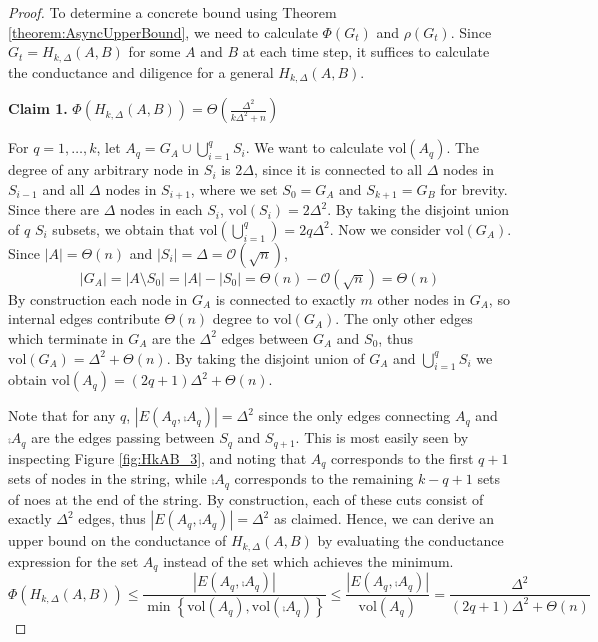 \begin{proof}
	To determine a concrete bound using Theorem \ref{theorem:AsyncUpperBound}, we need to calculate $\Phi(G_t)$ and $\rho(G_t)$. Since $G_t = H_{k, \Delta}(A, B)$ for some $A$ and $B$ at each time step, it suffices to calculate the conductance and diligence for a general $H_{k, \Delta}(A, B)$.

	\textbf{Claim 1.} $\Phi(H_{k, \Delta}(A, B)) = \Theta\left(\frac{\Delta^2}{k\Delta^2 +n }\right)$

	For $q = 1, \dots, k$, let $A_q = G_A \cup \bigcup_{i=1}^q  S_i$. We want to calculate $\text{vol}(A_q)$. The degree of any arbitrary node in $S_i$ is $2\Delta$, since it is connected to all $\Delta$ nodes in $S_{i-1}$ and all $\Delta$ nodes in $S_{i+1}$, where we set $S_0 = G_A$ and $S_{k+1} = G_B$ for brevity. Since there are $\Delta$ nodes in each $S_i$, $\text{vol}(S_i) = 2\Delta^2$. By taking the disjoint union of $q$ $S_i$ subsets, we obtain that $\text{vol}(\bigcup_{i=1}^q) = 2q\Delta^2$. Now we consider $\text{vol}(G_A)$. Since $|A| = \Theta(n)$ and $|S_i| = \Delta = \mathcal{O}(\sqrt{n})$, 
	$$
		|G_A| = |A \setminus S_0| = |A| - |S_0| = \Theta(n) - \mathcal{O}(\sqrt{n}) = \Theta(n)
	$$
	By construction each node in $G_A$ is connected to exactly $m$ %
	other nodes in $G_A$, so internal edges contribute $\Theta(n)$ degree to $\text{vol}(G_A)$. The only other edges which terminate in $G_A$ are the $\Delta^2$ edges between $G_A$ and $S_0$, thus $\text{vol}(G_A) = \Delta^2 + \Theta(n)$. By taking the disjoint union of $G_A$ and $\bigcup_{i=1}^q S_i$ we obtain $\text{vol}(A_q) = (2q + 1)\Delta^2 + \Theta(n)$. %
	
	Note that for any $q$, $|E(A_q,\comp{A_q})| = \Delta^2$ since the only edges connecting $A_q$ and $\comp{A_q}$ are the edges passing between $S_q$ and $S_{q+1}$. This is most easily seen by inspecting Figure \ref{fig:HkAB_3}, and noting that $A_q$ corresponds to the first $q + 1$ sets of nodes in the string, while $\comp{A_q}$ corresponds to the remaining $k - q + 1$ sets of noes at the end of the string. By construction, each of these cuts consist of exactly $\Delta^2$ edges, thus $|E(A_q,\comp{A_q})| = \Delta^2$ as claimed.
	Hence, we can derive an upper bound on the conductance of $H_{k, \Delta}(A, B)$ by evaluating the conductance expression for the set $A_q$ instead of the set which achieves the minimum. 
	$$
		\Phi(H_{k, \Delta}(A, B)) \leq \frac{|E(A_q, \comp{A_q})|}{\min \left\{ \text{vol}(A_q), \text{vol}(\comp{A_q}) \right\} } %
		\leq \frac{|E(A_q, \comp{A_q})|}{\text{vol}(A_q)} = \frac{\Delta^2}{(2q + 1)\Delta^2 + \Theta(n)}
	$$	


\end{proof}
